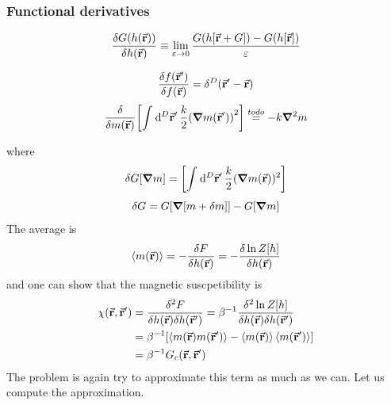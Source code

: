 \documentclass[../main/main.tex]{subfiles}
\begin{document}
\subsubsection{Functional derivatives}
\begin{equation}
  \frac{\delta G(h (\va{r}))}{\delta h (\va{r})} \equiv  \lim_{\varepsilon \rightarrow 0} \frac{G(h[\va{r}+G])- G(h[\va{r}])}{\varepsilon }
\end{equation}
\begin{example}{}{}
\begin{equation}
  \frac{\delta f (\va{r}')}{\delta f (\va{r})} = \delta ^D (\va{r}' - \va{r})
\end{equation}
\begin{equation}
  \frac{\delta }{\delta m (\va{r})} \qty[ \int_{}^{} \dd[D]{\va{r}'} \frac{k}{2} \qty(\grad m (\va{r}'))^2     ]  \overset{to do}{=} - k \grad ^2 m
\end{equation}
\end{example}
where
\begin{equation}
  \delta G [ \grad m] = \qty[ \int_{}^{} \dd[D]{\va{r}'} \frac{k}{2} ( \grad m(\va{r}))^2  ]
\end{equation}
\begin{equation}
  \delta G = G \qty[ \grad [m+\delta m]] - G [\grad m]
\end{equation}
The average is
\begin{equation}
  \expval{m(\va{r})} = - \frac{\delta F}{\delta h (\va{r})} = - \frac{\delta \ln{Z[h]} }{\delta h (\va{r})}
\end{equation}
and one can show that the magnetic suscpetibility is
\begin{equation}
\begin{split}
  \chi  (\va{r},\va{r}') & = \frac{\delta ^2 F}{\delta h(\va{r}) \delta h(\va{r}')}
  = \beta ^{-1} \frac{\delta ^2 \ln{Z[h]} }{\delta h (\va{r}) \delta h (\va{r}')}\\
  & = \beta ^{-1} \qty[ \expval{m(\va{r}) m (\va{r}')} - \expval{m (\va{r})} \expval{m(\va{r}')}  ] \\
  & = \beta ^{-1} G_c (\va{r},\va{r}') \\
\end{split}
\end{equation}
The problem is again try to approximate this term as much as we can.
Let us compute the approximation.
\end{document}
